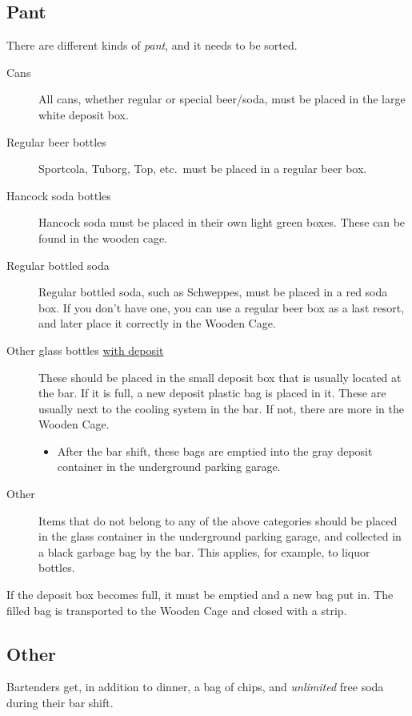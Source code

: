 \subsection{Pant}
\label{sec:intra:pant}

There are different kinds of \textit{pant}, and it needs to be sorted.
\begin{description}
    \item[Cans] All cans, whether regular or special
    beer/soda, must be placed in the large white deposit box.
    \item[Regular beer bottles] Sportcola, Tuborg, Top, etc.\ must be placed in a regular beer box.
    \item[Hancock soda bottles] Hancock soda must be placed in their own light green boxes. These can be found in the wooden cage.
    \item[Regular bottled soda] Regular bottled soda, such as Schweppes, must be placed in a
    red soda box. If you don't have one, you can use a regular beer box as a last resort, and later place it correctly in the Wooden Cage.
    \item[Other glass bottles \underline{with deposit}] These should be placed in the small deposit box that is usually located at the bar.
    If it is full, a new deposit plastic bag is placed in it. These are usually next to the cooling system in the bar.
    If not, there are more in the Wooden Cage.
    \begin{itemize}
        \item After the bar shift, these bags are emptied into the gray deposit container in the underground parking garage.
    \end{itemize}
    \item[Other] Items that do not belong to any of the above
    categories should be placed in the glass container in the underground parking garage,
    and collected in a black garbage bag by the bar. This applies, for example, to liquor bottles.
\end{description}

If the deposit box becomes full, it must be emptied and a new bag put in.
The filled bag is transported to the Wooden Cage and closed with a strip.

\subsection{Other}
\label{sec:intra:other}

Bartenders get, in addition to dinner, a bag of chips, and \textit{unlimited} free soda during their bar shift.

